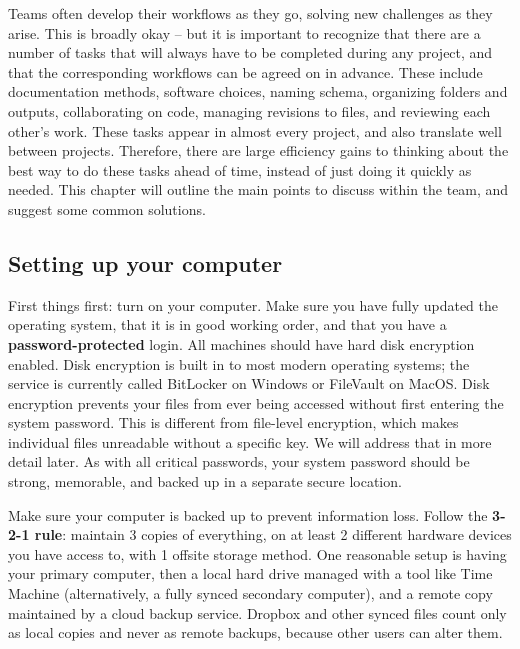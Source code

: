 Teams often develop their workflows as they go,
solving new challenges as they arise.
This is broadly okay -- but it is important to recognize
that there are a number of tasks that will always have to be completed during any project,
and that the corresponding workflows can be agreed on in advance.
These include documentation methods, software choices,
naming schema, organizing folders and outputs, collaborating on code,
managing revisions to files, and reviewing each other's work.
These tasks appear in almost every project,
and also translate well between projects.
Therefore, there are large efficiency gains to
thinking about the best way to do these tasks ahead of time,
instead of just doing it quickly as needed.
This chapter will outline the main points to discuss within the team,
and suggest some common solutions.

\subsection{Setting up your computer}

First things first: turn on your computer.
Make sure you have fully updated the operating system,
that it is in good working order,
and that you have a \textbf{password-protected} login.
All machines should have hard disk encryption enabled.
Disk encryption is built in to most modern operating systems;
the service is currently called BitLocker on Windows or FileVault on MacOS.
Disk encryption prevents your files from ever being accessed
without first entering the system password.
This is different from file-level encryption,
which makes individual files unreadable without a specific key.
We will address that in more detail later.
As with all critical passwords, your system password should be strong,
memorable, and backed up in a separate secure location.

Make sure your computer is backed up to prevent information loss.
Follow the \textbf{3-2-1 rule}: maintain 3 copies of everything,
on at least 2 different hardware devices you have access to,
with 1 offsite storage method.
One reasonable setup is having your primary computer,
then a local hard drive managed with a tool like Time Machine
(alternatively, a fully synced secondary computer),
and a remote copy maintained by a cloud backup service.
Dropbox and other synced files count only as local copies and never as remote backups,
because other users can alter them.

